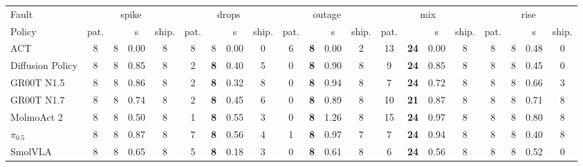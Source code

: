 \begin{tabular}{l cccccccccccccccccccc}
\toprule
Fault & \multicolumn{4}{c}{spike} & \multicolumn{4}{c}{drops} & \multicolumn{4}{c}{outage} & \multicolumn{4}{c}{mix} & \multicolumn{4}{c}{rise} \\
\cmidrule(lr){2-5}\cmidrule(lr){6-9}\cmidrule(lr){10-13}\cmidrule(lr){14-17}\cmidrule(lr){18-21}
Policy & pat. & \drtc{} & s & ship. & pat. & \drtc{} & s & ship. & pat. & \drtc{} & s & ship. & pat. & \drtc{} & s & ship. & pat. & \drtc{} & s & ship. \\
\midrule
ACT & 8 & 8 & 0.00 & 8 & 8 & 8 & 0.00 & 0 & 6 & \textbf{8} & 0.00 & 2 & 13 & \textbf{24} & 0.00 & 8 & 8 & 8 & 0.48 & 0 \\
Diffusion Policy & 8 & 8 & 0.85 & 8 & 2 & \textbf{8} & 0.40 & 5 & 0 & \textbf{8} & 0.90 & 8 & 9 & \textbf{24} & 0.85 & 8 & 8 & 8 & 0.45 & 0 \\
GR00T N1.5 & 8 & 8 & 0.86 & 8 & 2 & \textbf{8} & 0.32 & 8 & 0 & \textbf{8} & 0.94 & 8 & 7 & \textbf{24} & 0.72 & 8 & 8 & 8 & 0.66 & 3 \\
GR00T N1.7 & 8 & 8 & 0.74 & 8 & 2 & \textbf{8} & 0.45 & 6 & 0 & \textbf{8} & 0.89 & 8 & 10 & \textbf{21} & 0.87 & 8 & 8 & 8 & 0.71 & 8 \\
MolmoAct 2 & 8 & 8 & 0.50 & 8 & 1 & \textbf{8} & 0.55 & 3 & 0 & \textbf{8} & 1.26 & 8 & 15 & \textbf{24} & 0.97 & 8 & 8 & 8 & 0.80 & 8 \\
$\pi_{0.5}$ & 8 & 8 & 0.87 & 8 & 7 & \textbf{8} & 0.56 & 4 & 1 & \textbf{8} & 0.97 & 7 & 7 & \textbf{24} & 0.94 & 8 & 8 & 8 & 0.40 & 8 \\
SmolVLA & 8 & 8 & 0.65 & 8 & 5 & \textbf{8} & 0.18 & 3 & 0 & \textbf{8} & 0.61 & 8 & 6 & \textbf{24} & 0.56 & 8 & 8 & 8 & 0.52 & 0 \\
\bottomrule
\end{tabular}
